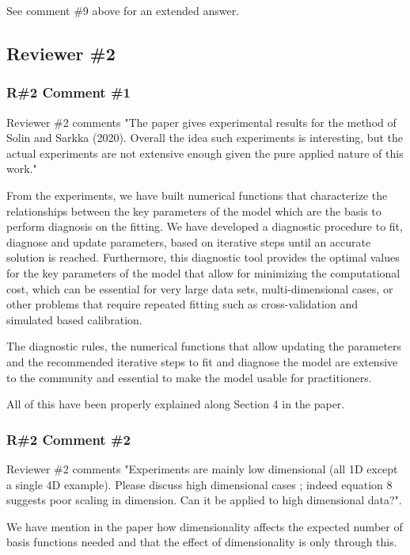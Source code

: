 \documentclass[11pt]{report}
\begin{document}
See comment \#9 above for an extended answer.

\noindent \hdashrule{12.5cm}{0.2pt}{2mm 1pt}

\subsection*{Reviewer \#2}

\subsubsection*{R\#2 Comment \#1}

Reviewer \#2 comments "The paper gives experimental results for the method of Solin and Sarkka  (2020). Overall the idea such experiments is interesting, but the actual experiments are not extensive enough given the pure applied nature of this work."

From the experiments, we have built numerical functions that characterize the relationships between the key parameters of the model which are the basis to perform diagnosis on the fitting. We have developed a diagnostic procedure to fit, diagnose and update parameters, based on iterative steps until an accurate solution is reached. Furthermore, this diagnostic tool provides the optimal values for the key parameters of the model that allow for minimizing the computational cost, which can be essential for very large data sets, multi-dimensional cases, or other problems that require repeated fitting such as cross-validation and simulated based calibration.

The diagnostic rules, the numerical functions that allow updating the parameters and the recommended iterative steps to fit and diagnose the model are extensive to the community and essential to make the model usable for practitioners.

All of this have been properly explained along Section 4 in the paper.

\subsubsection*{R\#2 Comment \#2}

Reviewer \#2 comments "Experiments are mainly low dimensional (all 1D except a single 4D example). Please discuss high dimensional cases ; indeed equation 8 suggests poor scaling in dimension. Can it be applied to high dimensional data?". 

We have mention in the paper how dimensionality affects the expected number of basis functions needed and that the effect of dimensionality is only through this. 
\end{document}
